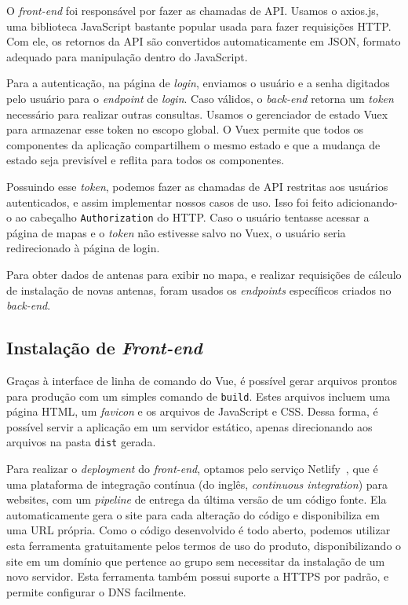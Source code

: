 \documentclass[]{politex}
\begin{document}
O \textit{front-end} foi responsável por fazer as chamadas de API.
Usamos o axios.js, uma biblioteca JavaScript bastante popular usada para fazer
requisições HTTP. Com ele, os retornos da API são convertidos
automaticamente em JSON, formato adequado para manipulação dentro do JavaScript.

Para a autenticação, na página de \textit{login}, enviamos o usuário e a senha digitados
pelo usuário para o \textit{endpoint} de \textit{login}. Caso válidos, o \textit{back-end} retorna um
\textit{token} necessário para realizar outras consultas. Usamos o gerenciador de estado Vuex
para armazenar esse token no escopo global. O Vuex permite que todos os
componentes da aplicação compartilhem o mesmo estado e que a mudança de estado
seja previsível e reflita para todos os componentes.

Possuindo esse \textit{token}, podemos fazer as chamadas de API restritas aos usuários
autenticados, e assim implementar nossos casos de uso. Isso foi feito adicionando-o
ao cabeçalho \texttt{Authorization} do HTTP. Caso o usuário tentasse acessar a
página de mapas e o \textit{token} não estivesse salvo no Vuex, o usuário seria
redirecionado à página de login.

Para obter dados de antenas para exibir no mapa, e realizar requisições de
cálculo de instalação de novas antenas, foram usados os \textit{endpoints}
específicos criados no \textit{back-end}.

\subsection{Instalação de \textit{Front-end}}

Graças à interface de linha de comando do Vue, é possível gerar arquivos
prontos para produção com um simples comando de \texttt{build}. Estes arquivos
incluem uma página HTML, um \textit{favicon} e os arquivos de JavaScript e CSS.
Dessa forma, é possível servir a aplicação em um servidor estático, apenas
direcionando aos arquivos na pasta \texttt{dist} gerada.

Para realizar o \textit{deployment} do \textit{front-end}, optamos pelo serviço
Netlify~\cite{netlify}, que é uma plataforma de integração contínua (do inglês,
\textit{continuous integration}) para websites, com um \textit{pipeline} de
entrega da última versão de um código fonte. Ela automaticamente gera o site
para cada alteração do código e disponibiliza em uma URL própria. Como o código
desenvolvido é todo aberto, podemos utilizar esta ferramenta gratuitamente pelos
termos de uso do produto, disponibilizando o site em um domínio que pertence ao
grupo sem necessitar da instalação de um novo servidor. Esta ferramenta também
possui suporte a HTTPS por padrão, e permite configurar o DNS facilmente.
\end{document}
